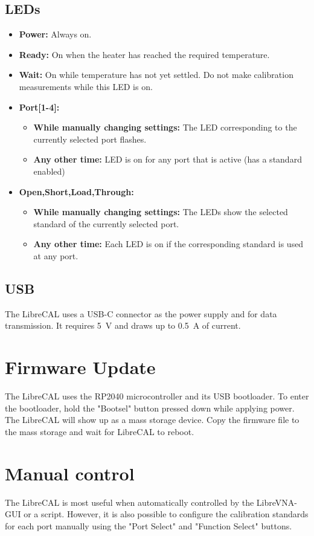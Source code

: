 \documentclass[a4paper,11pt]{article}
\newcommand{\dev}{LibreCAL}
\begin{document}
\subsection{LEDs}
\begin{itemize}
\item \textbf{Power:} Always on.
\item \textbf{Ready:} On when the heater has reached the required temperature.
\item \textbf{Wait:} On while temperature has not yet settled. Do not make calibration measurements while this LED is on.
\item \textbf{Port[1-4]:}
\begin{itemize}
\item \textbf{While manually changing settings:} The LED corresponding to the currently selected port flashes.
\item \textbf{Any other time:} LED is on for any port that is active (has a standard enabled)
\end{itemize}
\item \textbf{Open,Short,Load,Through:}
\begin{itemize}
\item \textbf{While manually changing settings:} The LEDs show the selected standard of the currently selected port.
\item \textbf{Any other time:} Each LED is on if the corresponding standard is used at any port.
\end{itemize}
\end{itemize}

\subsection{USB}
The \dev{} uses a USB-C connector as the power supply and for data transmission. It requires \SI{5}{\volt} and draws up to \SI{0.5}{\ampere} of current.


\section{Firmware Update}
The \dev{} uses the RP2040 microcontroller and its USB bootloader. To enter the bootloader, hold the "Bootsel" button pressed down while applying power. The \dev{} will show up as a mass storage device. Copy the firmware file to the mass storage and wait for \dev{} to reboot.

\section{Manual control}
The \dev{} is most useful when automatically controlled by the LibreVNA-GUI or a script. However, it is also possible to configure the calibration standards for each port manually using the "Port Select" and "Function Select" buttons.
\end{document}
